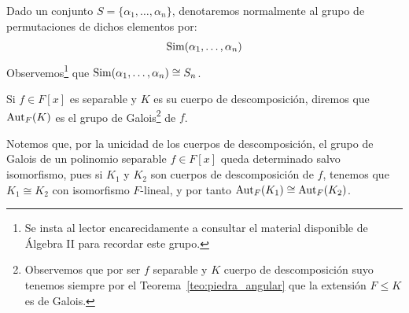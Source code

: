 \begin{notacion} 
    Dado un conjunto $S = \{\alpha_1, \ldots, \alpha_n\}$, denotaremos normalmente al grupo de permutaciones de dichos elementos por:
    \begin{equation*}
        \operatorname{Sim}(\alpha_1, \ldots, \alpha_n)
    \end{equation*}
    Observemos\footnote{Se insta al lector encarecidamente a consultar el material disponible de Álgebra II para recordar este grupo.} que $\operatorname{Sim}(\alpha_1,\ldots, \alpha_n)\cong S_n$.
\end{notacion}

\begin{definicion}
    Si $f\in F[x]$ es separable y $K$ es su cuerpo de descomposición, diremos que $\operatorname{Aut}_F(K)$ es el grupo de Galois\footnote{Observemos que por ser $f$ separable y $K$ cuerpo de descomposición suyo tenemos siempre por el Teorema~\ref{teo:piedra_angular} que la extensión $F\leq K$ es de Galois.} de $f$.
\end{definicion}

Notemos que, por la unicidad de los cuerpos de descomposición, el grupo de Galois de un polinomio separable $f\in F[x]$ queda determinado salvo isomorfismo, pues si $K_1$ y $K_2$ son cuerpos de descomposición de $f$, tenemos que $K_1\cong K_2$ con isomorfismo $F$-lineal, y por tanto $\operatorname{Aut}_F(K_1)\cong \operatorname{Aut}_F(K_2)$.\\


